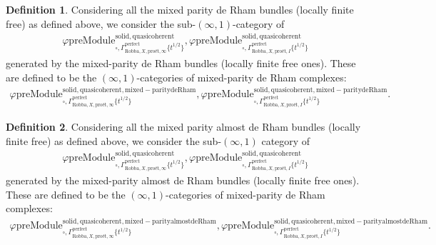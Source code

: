 \documentclass[12pt]{book}
\theoremstyle{definition}
\newtheorem{definition}{Definition}
\begin{document}
\begin{definition}
Considering all the mixed parity de Rham bundles (locally finite free) as defined above, we consider the sub-$(\infty,1)$-category of 
\begin{align}
\varphi\mathrm{preModule}^\mathrm{solid,quasicoherent}_{\square,\Gamma^\mathrm{perfect}_{\text{Robba},X,\text{pro\'et},\infty}\{t^{1/2}\}},
\varphi\mathrm{preModule}^\mathrm{solid,quasicoherent}_{\square,\Gamma^\mathrm{perfect}_{\text{Robba},X,\text{pro\'et},I}\{t^{1/2}\}} 
\end{align}
generated by the mixed-parity de Rham bundles (locally finite free ones). These are defined to be the $(\infty,1)$-categories of mixed-parity de Rham complexes:
\begin{align}
\varphi\mathrm{preModule}^\mathrm{solid,quasicoherent,mixed-paritydeRham}_{\square,\Gamma^\mathrm{perfect}_{\text{Robba},X,\text{pro\'et},\infty}\{t^{1/2}\}},
\varphi\mathrm{preModule}^\mathrm{solid,quasicoherent,mixed-paritydeRham}_{\square,\Gamma^\mathrm{perfect}_{\text{Robba},X,\text{pro\'et},I}\{t^{1/2}\}}. 
\end{align}
\end{definition}


\begin{definition}
Considering all the mixed parity almost de Rham bundles (locally finite free) as defined above, we consider the sub-$(\infty,1)$ category of 
\begin{align}
\varphi\mathrm{preModule}^\mathrm{solid,quasicoherent}_{\square,\Gamma^\mathrm{perfect}_{\text{Robba},X,\text{pro\'et},\infty}\{t^{1/2}\}},
\varphi\mathrm{preModule}^\mathrm{solid,quasicoherent}_{\square,\Gamma^\mathrm{perfect}_{\text{Robba},X,\text{pro\'et},I}\{t^{1/2}\}} 
\end{align}
generated by the mixed-parity almost de Rham bundles (locally finite free ones). These are defined to be the $(\infty,1)$-categories of mixed-parity de Rham complexes:
\begin{align}
\varphi\mathrm{preModule}^\mathrm{solid,quasicoherent,mixed-parityalmostdeRham}_{\square,\Gamma^\mathrm{perfect}_{\text{Robba},X,\text{pro\'et},\infty}\{t^{1/2}\}},
\varphi\mathrm{preModule}^\mathrm{solid,quasicoherent,mixed-parityalmostdeRham}_{\square,\Gamma^\mathrm{perfect}_{\text{Robba},X,\text{pro\'et},I}\{t^{1/2}\}}. 
\end{align}
\end{definition}
\end{document}
